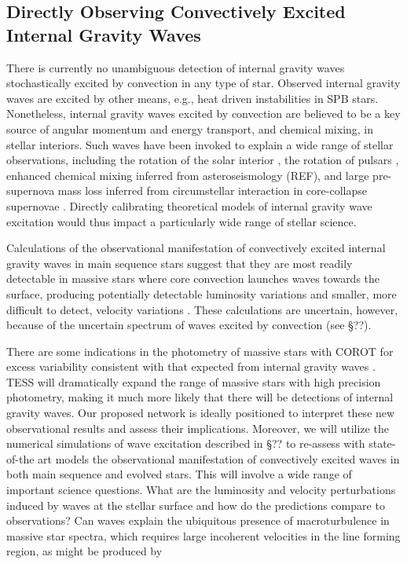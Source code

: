 \color{blue}
\subsection{Directly Observing Convectively Excited Internal Gravity Waves}

There is currently no unambiguous detection of  internal gravity waves stochastically excited by convection in any type of star.  Observed internal gravity waves  are excited by other means, e.g., heat driven instabilities in SPB stars. Nonetheless, internal gravity waves excited by convection are believed to be a key source of angular momentum and energy transport, and chemical mixing, in stellar interiors.   Such waves have been invoked to explain a wide range of stellar observations, including the rotation of the solar interior \citep{Kumar_1999}, the rotation of pulsars \citep{fullerwave:15}, enhanced chemical mixing inferred from asteroseismology (REF), and large pre-supernova mass loss inferred from circumstellar interaction in core-collapse supernovae \citep{quataert:12}.   Directly calibrating theoretical models of internal gravity wave excitation would thus impact a particularly wide range of stellar science.

Calculations of the observational manifestation of convectively excited internal gravity waves in main sequence stars suggest that they are most readily detectable in massive stars where core convection launches waves towards the surface, producing potentially detectable luminosity variations and smaller, more difficult to detect, velocity variations \citep{samadi2010,shiode2013}.   These calculations are uncertain, however, because of the uncertain spectrum of waves excited by convection (see \S ??).   

There are some indications in the photometry of massive stars with COROT for excess variability consistent with that expected from internal gravity waves \citep{aerts2015}.   TESS will dramatically expand the range of massive stars with high precision photometry, making it much more likely that there will be detections of  internal gravity waves.   
Our proposed network is ideally positioned to interpret these new observational results and assess their implications.   Moreover, we will utilize the numerical simulations of wave excitation described in \S ?? to re-assess with state-of-the art models the observational manifestation of convectively excited waves in both main sequence and evolved stars.  This will involve a wide range of important science questions. What are the luminosity and velocity perturbations induced by waves at the stellar surface and how do the predictions compare to observations?   Can waves explain the ubiquitous presence of macroturbulence in massive star spectra, which requires large incoherent velocities in the line forming region, as might be produced by 


